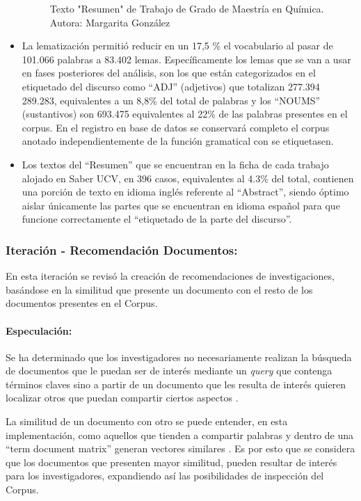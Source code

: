 \documentclass[
  12pt,
  openany]{book}
\begin{document}
\begin{itemize}
\begin{figure}
  \caption{Texto "Resumen" de Trabajo de Grado de Maestría en Química. Autora: Margarita González}\label{fig:quimica}
  \end{figure}
\item
  La lematización permitió reducir en un 17,5 \% el vocabulario al pasar de 101.066 palabras a 83.402 lemas. Específicamente los lemas que se van a usar en fases posteriores del análisis, son los que están categorizados en el etiquetado del discurso como ``ADJ'' (adjetivos) que totalizan 277.394 289.283, equivalentes a un 8,8\% del total de palabras y los ``NOUMS'' (sustantivos) son 693.475 equivalentes al 22\% de las palabras presentes en el corpus. En el registro en base de datos se conservará completo el corpus anotado independientemente de la función gramatical con se etiquetasen.
\item
  Los textos del ``Resumen'' que se encuentran en la ficha de cada trabajo alojado en Saber UCV, en 396 casos, equivalentes al 4.3\% del total, contienen una porción de texto en idioma inglés referente al ``Abstract'', siendo óptimo aislar únicamente las partes que se encuentran en idioma español para que funcione correctamente el ``etiquetado de la parte del discurso''.
\end{itemize}

\hypertarget{imrecomendacion}{%
\subsubsection{Iteración - Recomendación Documentos:}\label{imrecomendacion}}

En esta iteración se revisó la creación de recomendaciones de investigaciones, basándose en la similitud que presente un documento con el resto de los documentos presentes en el Corpus.

\hypertarget{especulaciuxf3n-5}{%
\paragraph{Especulación:}\label{especulaciuxf3n-5}}

Se ha determinado que los investigadores no necesariamente realizan la búsqueda de documentos que le puedan ser de interés mediante un \emph{query} que contenga términos claves sino a partir de un documento que les resulta de interés quieren localizar otros que puedan compartir ciertos aspectos \citep{zhou2018}.

La similitud de un documento con otro se puede entender, en esta implementación, como aquellos que tienden a compartir palabras y dentro de una ``term document matrix'' generan vectores similares \citep{jurafsky2009}. Es por esto que se considera que los documentos que presenten mayor similitud, pueden resultar de interés para los investigadores, expandiendo así las posibilidades de inspección del Corpus.
\end{document}
